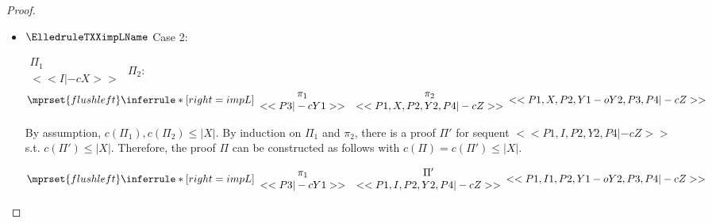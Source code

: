 \begin{proof}
\begin{enumerate}
\begin{itemize}
  \item $\ElledruleTXXimpLName$ Case 2:
      \begin{center}
        \scriptsize
        \begin{math}
          \begin{array}{c}
            \Pi_1 \\
            {<<I |-c X>>}
          \end{array}
        \end{math}
        \qquad\qquad
        $\Pi_2$:
        \begin{math}
          $$\mprset{flushleft}
          \inferrule* [right={\tiny impL}] {
            {
              \begin{array}{cc}
                \pi_1 & \pi_2 \\
                {<<P3 |-c Y1>>} & {<<P1, X, P2, Y2, P4 |-c Z>>}
              \end{array}
            }
          }{<<P1, X, P2, Y1 -o Y2, P3, P4 |-c Z>>}
        \end{math}
      \end{center}
      By assumption, $c(\Pi_1),c(\Pi_2)\leq |X|$. By induction on $\Pi_1$ and $\pi_2$, there is
      a proof $\Pi'$ for sequent $<<P1, I, P2, Y2, P4 |-c Z>>$ s.t. $c(\Pi') \leq |X|$.
      Therefore, the proof $\Pi$ can be constructed as follows with
      $c(\Pi) = c(\Pi') \leq |X|$.
      \begin{center}
        \scriptsize
        \begin{math}
          $$\mprset{flushleft}
          \inferrule* [right={\tiny impL}] {
            {
              \begin{array}{cc}
                \pi_1 & \Pi' \\
                {<<P3 |-c Y1>>} & {<<P1, I, P2, Y2, P4 |-c Z>>}
              \end{array}
            }
          }{<<P1, I1, P2, Y1 -o Y2, P3, P4 |-c Z>>}
        \end{math}
      \end{center}


\end{itemize}
\end{enumerate}
\end{proof}
